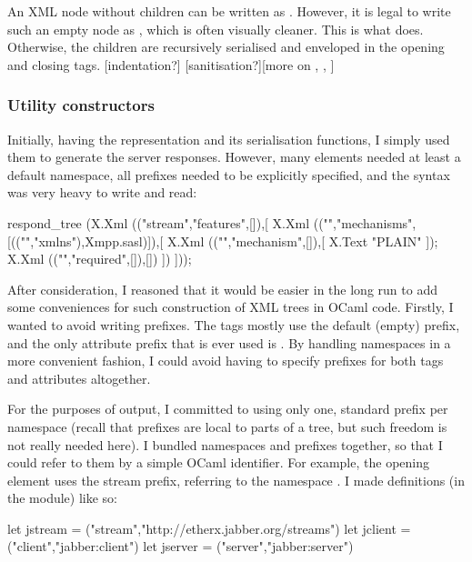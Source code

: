\documentclass[12pt,a4paper,twoside,openright]{report}
\begin{document}
{An XML node without children can be written as . However, it is legal to write such an empty node as , which is often visually cleaner. This is what  does. Otherwise, the children are recursively serialised and enveloped in the opening and closing tags. [indentation?] [sanitisation?][more on , , ]

\subsubsection{Utility constructors}
Initially, having the  representation and its serialisation functions, I simply used them to generate the server responses. However, many elements needed at least a default namespace, all prefixes needed to be explicitly specified, and the syntax was very heavy to write and read:

\begin{ocaml}
respond_tree
  (X.Xml (("stream","features",[]),[
    X.Xml (("","mechanisms",[(("","xmlns"),Xmpp.sasl)]),[
        X.Xml (("","mechanism",[]),[ X.Text "PLAIN" ]);
        X.Xml (("","required",[]),[])
      ])
  ]));
\end{ocaml}

After consideration, I reasoned that it would be easier in the long run to add some conveniences for such construction of XML trees in OCaml code. Firstly, I wanted to avoid writing prefixes. The tags mostly use the default (empty) prefix, and the only attribute prefix that is ever used is . By handling namespaces in a more convenient fashion, I could avoid having to specify prefixes for both tags and attributes altogether.

For the purposes of output, I committed to using only one, standard prefix per namespace (recall that prefixes are local to parts of a tree, but such freedom is not really needed here). I bundled namespaces and prefixes together, so that I could refer to them by a simple OCaml identifier. For example, the opening  element uses the stream prefix, referring to the namespace . I made definitions (in the  module) like so:

\begin{ocaml}
let jstream  = ("stream","http://etherx.jabber.org/streams")
let jclient  = ("client","jabber:client")
let jserver  = ("server","jabber:server")
\end{ocaml}

}
\end{document}
